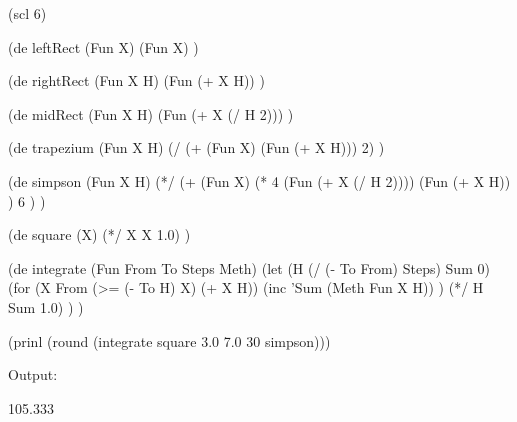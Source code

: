 \begin{wideverbatim}

(scl 6)

(de leftRect (Fun X)
   (Fun X) )

(de rightRect (Fun X H)
   (Fun (+ X H)) )

(de midRect (Fun X H)
   (Fun (+ X (/ H 2))) )

(de trapezium (Fun X H)
   (/ (+ (Fun X) (Fun (+ X H))) 2) )

(de simpson (Fun X H)
   (*/
      (+
         (Fun X)
         (* 4 (Fun (+ X (/ H 2))))
         (Fun (+ X H)) )
      6 ) )

(de square (X)
   (*/ X X 1.0) )

(de integrate (Fun From To Steps Meth)
   (let (H (/ (- To From) Steps)  Sum 0)
      (for (X From  (>= (- To H) X)  (+ X H))
         (inc 'Sum (Meth Fun X H)) )
      (*/ H Sum 1.0) ) )

(prinl (round (integrate square 3.0 7.0 30 simpson)))

Output:

105.333

\end{wideverbatim}



% 

